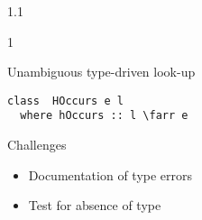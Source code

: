 \documentclass{slides}
\newenvironment{myslide}{\begin{slide}\color{Blue}\begin{boxedminipage}{1.1\hsize}\begin{boxedminipage}{1\hsize}\color{Black}
\vspace{-170\in}
}{%
\smallskip
\end{boxedminipage}
\end{boxedminipage}
\end{slide}}
\newenvironment{myslide}{\begin{slide}
}{%
\end{slide}}
\newenvironment{myslide}{\begin{slide}\color{White}\begin{boxedminipage}{1.1\hsize}\color{Black}
\vspace{-170\in}
}{%
\smallskip
\end{boxedminipage}
\end{slide}}
\newcommand{\header}[1]{{\large \color{Red} #1}}
\newcommand{\farr}{\ensuremath{\to}}
\begin{document}
\begin{myslide}

\header{Unambiguous type-driven look-up}

\bigskip

\begin{Verbatim}[fontfamily=courier,commandchars=\\\{\}]
 class  HOccurs e l
  where hOccurs :: l \farr e  
\end{Verbatim}

\bigskip

Challenges

\begin{itemize}
\item Documentation of type errors
\item Test for absence of type
\end{itemize}

\end{myslide}



\end{document}
